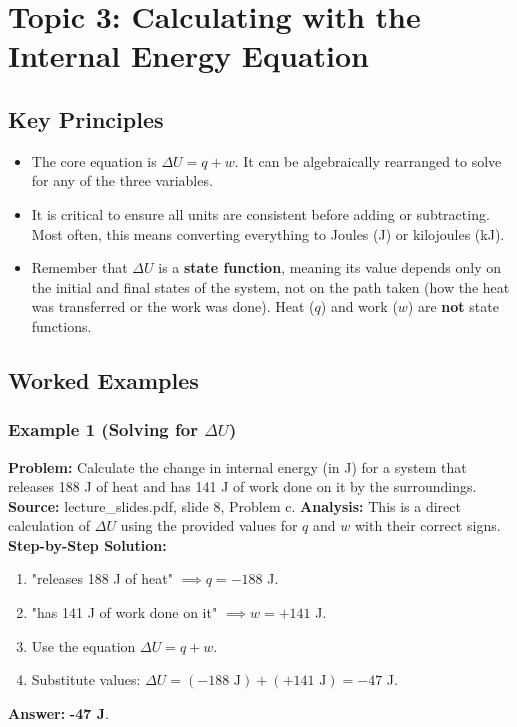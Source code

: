 \documentclass{article}
\begin{document}
\section{Topic 3: Calculating with the Internal Energy Equation}
\subsection{Key Principles}
\begin{itemize}
    \item The core equation is $\Delta U = q + w$. It can be algebraically rearranged to solve for any of the three variables.
    \item It is critical to ensure all units are consistent before adding or subtracting. Most often, this means converting everything to Joules (J) or kilojoules (kJ).
    \item Remember that $\Delta U$ is a \textbf{state function}, meaning its value depends only on the initial and final states of the system, not on the path taken (how the heat was transferred or the work was done). Heat ($q$) and work ($w$) are \textbf{not} state functions.
\end{itemize}

\subsection{Worked Examples}
\subsubsection{Example 1 (Solving for $\Delta U$)}
\textbf{Problem:} Calculate the change in internal energy (in J) for a system that releases 188 J of heat and has 141 J of work done on it by the surroundings.
\textbf{Source:} lecture\_slides.pdf, slide 8, Problem c.
\textbf{Analysis:} This is a direct calculation of $\Delta U$ using the provided values for $q$ and $w$ with their correct signs.
\textbf{Step-by-Step Solution:}
\begin{enumerate}
    \item "releases 188 J of heat" $\implies q = -188$ J.
    \item "has 141 J of work done on it" $\implies w = +141$ J.
    \item Use the equation $\Delta U = q + w$.
    \item Substitute values: $\Delta U = (-188 \text{ J}) + (+141 \text{ J}) = -47$ J.
\end{enumerate}
\textbf{Answer:} \textbf{-47 J}.
\end{document}
